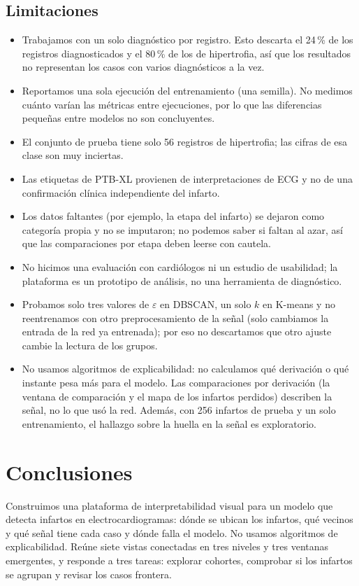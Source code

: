 \documentclass[conference]{IEEEtran}
\begin{document}
\subsection{Limitaciones}
\begin{itemize}
\item Trabajamos con un solo diagnóstico por registro. Esto descarta el 24\,\% de los registros diagnosticados y el 80\,\% de los de hipertrofia, así que los resultados no representan los casos con varios diagnósticos a la vez.
\item Reportamos una sola ejecución del entrenamiento (una semilla). No medimos cuánto varían las métricas entre ejecuciones, por lo que las diferencias pequeñas entre modelos no son concluyentes.
\item El conjunto de prueba tiene solo 56 registros de hipertrofia; las cifras de esa clase son muy inciertas.
\item Las etiquetas de PTB-XL provienen de interpretaciones de ECG y no de una confirmación clínica independiente del infarto.
\item Los datos faltantes (por ejemplo, la etapa del infarto) se dejaron como categoría propia y no se imputaron; no podemos saber si faltan al azar, así que las comparaciones por etapa deben leerse con cautela.
\item No hicimos una evaluación con cardiólogos ni un estudio de usabilidad; la plataforma es un prototipo de análisis, no una herramienta de diagnóstico.
\item Probamos solo tres valores de $\varepsilon$ en DBSCAN, un solo $k$ en K-means y no reentrenamos con otro preprocesamiento de la señal (solo cambiamos la entrada de la red ya entrenada); por eso no descartamos que otro ajuste cambie la lectura de los grupos.
\item No usamos algoritmos de explicabilidad: no calculamos qué derivación o qué instante pesa más para el modelo. Las comparaciones por derivación (la ventana de comparación y el mapa de los infartos perdidos) describen la señal, no lo que usó la red. Además, con 256 infartos de prueba y un solo entrenamiento, el hallazgo sobre la huella en la señal es exploratorio.
\end{itemize}

\section{Conclusiones}
Construimos una plataforma de interpretabilidad visual para un modelo que detecta infartos en electrocardiogramas: dónde se ubican los infartos, qué vecinos y qué señal tiene cada caso y dónde falla el modelo. No usamos algoritmos de explicabilidad. Reúne siete vistas conectadas en tres niveles y tres ventanas emergentes, y responde a tres tareas: explorar cohortes, comprobar si los infartos se agrupan y revisar los casos frontera.
\end{document}
